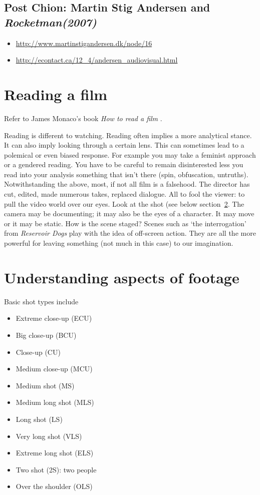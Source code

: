 \subsection{Post Chion: Martin Stig Andersen and \textit{Rocketman(2007)}}
\begin{itemize}
\item \url{http://www.martinstigandersen.dk/node/16}
\item \url{http://econtact.ca/12_4/andersen_audiovisual.html}
\end{itemize}

\section{Reading a film}
Refer to James Monaco's book \textit{How to read a film} \citep{monaco2000read}. 

Reading is different to watching. Reading often implies a more analytical stance. It can also imply looking through a certain lens. This can sometimes lead to a polemical or even biased response. For example you may take a feminist approach or a gendered reading. You have to be careful to remain disinterested less you read into your analysis something that isn't there (spin, obfuscation, untruths).
Notwithstanding the above, most, if not all film is a falsehood. The director has cut, edited, made numerous takes, replaced dialogue. All to fool the viewer: to pull the video world over our eyes. Look at the shot (see below section~\ref{aspects_of_footage}. The camera may be documenting; it may also be the eyes of a character. It may move or it may be static. How is the scene staged? Scenes such as `the interrogation' from \textit{Reservoir Dogs} play with the idea of off-screen action. They are all the more powerful for leaving something (not much in this case) to our imagination. 

\section{Understanding aspects of footage}
\label{aspects_of_footage}
Basic shot types include
\begin{itemize}
\item Extreme close-up (ECU)
\item Big close-up (BCU)
\item Close-up (CU)
\item Medium close-up (MCU)
\item Medium shot (MS)
\item Medium long shot (MLS)
\item Long shot (LS)
\item Very long shot (VLS)
\item Extreme long shot (ELS)
\item Two shot (2S): two people
\item Over the shoulder (OLS)
\end{itemize}


